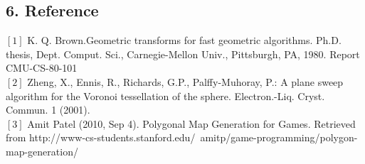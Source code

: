 \documentclass{article}
\begin{document}
\subsection*{6. Reference}
$[1]$ K. Q. Brown.Geometric transforms for fast geometric algorithms. Ph.D. thesis, Dept. Comput. Sci., Carnegie-Mellon Univ., Pittsburgh, PA, 1980. Report CMU-CS-80-101
\\ 
$[2]$ Zheng, X., Ennis, R., Richards, G.P., Palffy-Muhoray, P.: A plane sweep algorithm for the Voronoi tessellation of the sphere. Electron.-Liq. Cryst. Commun. 1 (2001).
\\
$[3]$ Amit Patel (2010, Sep 4). Polygonal Map Generation for Games. Retrieved from http://www-cs-students.stanford.edu/~amitp/game-programming/polygon-map-generation/
\end{document}
